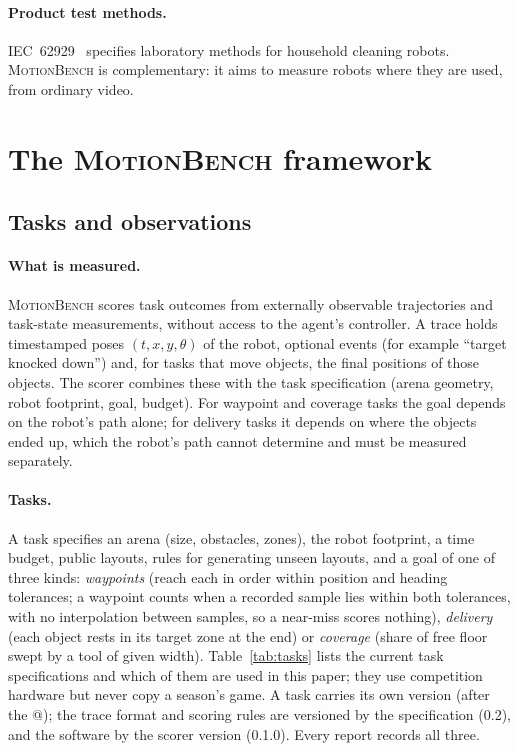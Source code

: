 \documentclass[11pt]{article}
\newcommand{\mb}{\textsc{MotionBench}}
\begin{document}
\paragraph{Product test methods.} IEC~62929~\cite{iec62929} specifies laboratory methods for household
cleaning robots. \mb{} is complementary: it aims to measure robots where they are used, from
ordinary video.

\section{The \mb{} framework}\label{sec:framework}

\subsection{Tasks and observations}

\paragraph{What is measured.} \mb{} scores task outcomes from externally observable trajectories and
task-state measurements, without access to the agent's controller. A trace holds timestamped poses
$(t,x,y,\theta)$ of the robot, optional events (for example ``target knocked down'') and, for tasks
that move objects, the final positions of those objects. The scorer combines these with the task
specification (arena geometry, robot footprint, goal, budget). For waypoint and coverage tasks the
goal depends on the robot's path alone; for delivery tasks it depends on where the objects ended up,
which the robot's path cannot determine and must be measured separately.

\paragraph{Tasks.} A task specifies an arena (size, obstacles, zones), the robot footprint, a time
budget, public layouts, rules for generating unseen layouts, and a goal of one of three kinds:
\emph{waypoints} (reach each in order within position and heading tolerances; a waypoint counts
when a recorded sample lies within both tolerances, with no interpolation between samples, so a
near-miss scores nothing), \emph{delivery} (each
object rests in its target zone at the end) or \emph{coverage} (share of free floor swept by a tool of
given width). Table~\ref{tab:tasks} lists the current task specifications and which of them are used
in this paper; they use competition hardware but never copy a season's game. A task carries its own
version (after the @); the trace format and scoring rules are versioned by the specification (0.2),
and the software by the scorer version (0.1.0). Every report records all three.
\end{document}
